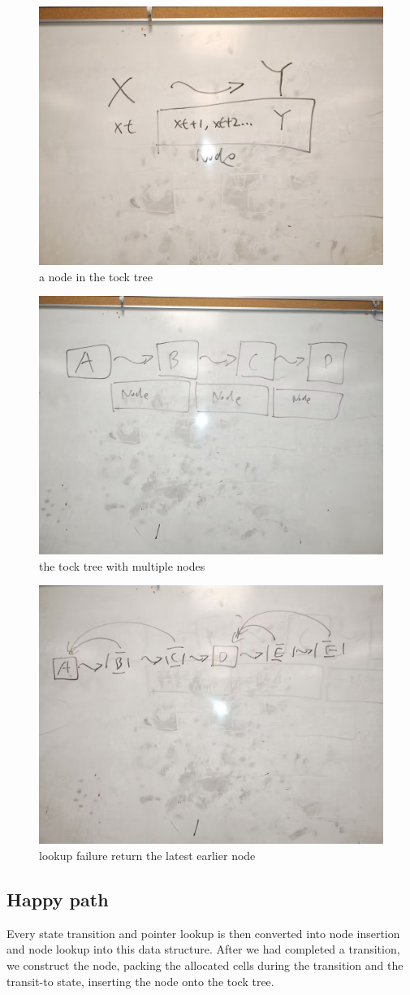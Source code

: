 \begin{figure}
	\includegraphics[width=0.5\columnwidth]{2}
	\caption{a node in the tock tree}
\end{figure}
\begin{figure}
	\includegraphics[width=0.5\columnwidth]{3}
	\caption{the tock tree with multiple nodes}
\end{figure}

\begin{figure}
	\includegraphics[width=0.5\columnwidth]{4}
	\caption{lookup failure return the latest earlier node}
\end{figure}


\subsection{Happy path}
Every state transition and pointer lookup is then converted into node insertion and node lookup into this data structure. After we had completed a transition, we construct the node, packing the allocated cells during the transition and the transit-to state, inserting the node onto the tock tree.

